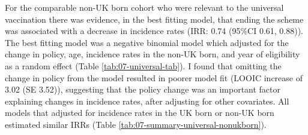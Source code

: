 \documentclass[11pt,twoside]{bristolthesis}
\begin{document}
  For the comparable non-UK born cohort who were relevant to the universal vaccination there was evidence, in the best fitting model, that ending the scheme was associated with a decrease in incidence rates (IRR: 0.74 (95\%CI 0.61, 0.88)). The best fitting model was a negative binomial model which adjusted for the change in policy, age, incidence rates in the non-UK born, and year of eligibility as a random effect (Table \ref{tab:07-universal-tab}). I found that omitting the change in policy from the model resulted in poorer model fit (LOOIC increase of 3.02 (SE 3.52)), suggesting that the policy change was an important factor explaining changes in incidence rates, after adjusting for other covariates. All models that adjusted for incidence rates in the UK born or non-UK born estimated similar IRRs (Table \ref{tab:07-summary-universal-nonukborn}).
  \begin{landscape}\begin{table}[!h]
  

\end{table}
\end{landscape}
\end{document}
